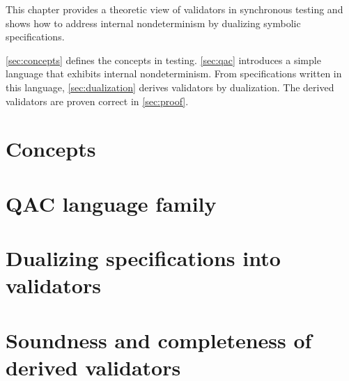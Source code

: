 This chapter provides a theoretic view of validators in synchronous
testing and shows how to address internal nondeterminism by dualizing
symbolic specifications.

\autoref{sec:concepts} defines the concepts in testing.  \autoref{sec:qac}
introduces a simple language that exhibits internal nondeterminism.  From
specifications written in this language, \autoref{sec:dualization} derives
validators by dualization.  The derived validators are proven correct
in \autoref{sec:proof}.

\section{Concepts}
\label{sec:concepts}


\section{QAC language family}
\label{sec:qac}


\section{Dualizing specifications into validators}
\label{sec:dualization}


\section{Soundness and completeness of derived validators}
\label{sec:proof}

